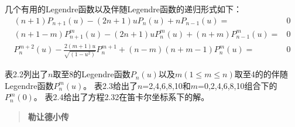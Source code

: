 几个有用的Legendre函数以及伴随Legendre函数的递归形式如下：
\begin{subequations}\label{eqn:legendre function2}
	\begin{align}
(n+1)P_{n+1}(u)-(2n+1)uP_n(u)+nP_{n-1}(u)=&0  \\
(n+1-m)P^m_{n+1}(u)-(2n+1)uP^m_n(u)+(n+m)P^m_{n-1}(u)=&0  \\
P_n^{m+2}(u)-\frac{2(m+1)u}{\sqrt{(1-u^2)}}P_n^{m+1}+(n-m)(n+m-1)P_n^m(u)=&0
  	\end{align}
\end{subequations}

表2.2列出了$n$取至8的Legendre函数$P_n(u)$以及$m(1\le m\le n)$取至4的的伴随Legendre函数$P_n^m(u)$。
表2.3给出了$n$=2,4,6,8,10和$m$=0,2,4,6,8,10组合下的$P_n^m(0)$。
表2.4给出了方程2.32在笛卡尔坐标系下的解。

\begin{quotation}
\textbf{勒让德小传}\ 
\end{quotation}

